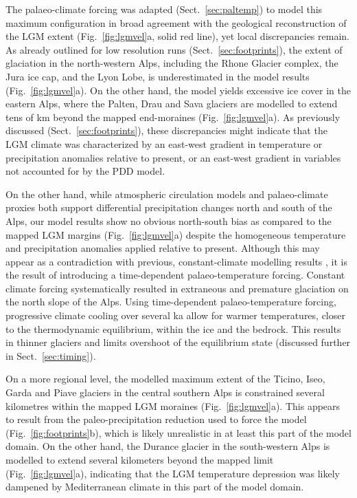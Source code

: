 \documentclass[tc, manuscript]{copernicus}
\begin{document}
    The palaeo-climate forcing was adapted (Sect.~\ref{sec:paltemp})
    to model this maximum configuration in broad agreement with the geological
    reconstruction of the LGM extent (Fig.~\ref{fig:lgmvel}a, solid red line),
    yet local discrepancies remain. As already outlined for low resolution
    runs (Sect.~\ref{sec:footprints}), the extent of glaciation in the
    north-western Alps, including the Rhone Glacier complex, the Jura ice cap,
    and the Lyon Lobe, is underestimated in the model results
    (Fig.~\ref{fig:lgmvel}a). On the other hand, the model yields excessive ice
    cover in the eastern Alps, where the Palten, Drau and Sava glaciers are
    modelled to extend tens of km beyond the mapped end-moraines
    (Fig.~\ref{fig:lgmvel}a). As previously discussed
    (Sect.~\ref{sec:footprints}), these discrepancies might indicate that the
    LGM climate was characterized by an east-west gradient in temperature
    \citep[cf.][]{Heyman.etal.2013} or precipitation
    \citep[cf.][]{Wu.etal.2007} anomalies relative to present, or an east-west
    gradient in variables not accounted for by the PDD model.

    On the other hand, while atmospheric circulation models
    \citep{Strandberg.etal.2011, Ludwig.etal.2016} and palaeo-climate proxies
    \citep{Luetscher.etal.2015} both support differential precipitation changes
    north and south of the Alps, our model results show no obvious north-south
    bias as compared to the mapped LGM margins (Fig.~\ref{fig:lgmvel}a) despite
    the homogeneous temperature and precipitation anomalies applied relative to
    present. Although this may appear as a contradiction with previous,
    constant-climate modelling results \citep{Becker.etal.2016}, it is the
    result of introducing a time-dependent palaeo-temperature forcing. Constant
    climate forcing systematically resulted in extraneous
    \citep[Fig.~3]{Becker.etal.2016} and premature
    \citep[Fig.~4]{Becker.etal.2016} glaciation on the north slope of the Alps.
    Using time-dependent palaeo-temperature forcing, progressive climate
    cooling over several ka allow for warmer temperatures, closer to
    the thermodynamic equilibrium, within the ice and the bedrock. This results
    in thinner glaciers and limits overshoot of the equilibrium state
    (discussed further in Sect.~\ref{sec:timing}).

    On a more regional level, the modelled maximum extent of the Ticino, Iseo,
    Garda and Piave glaciers in the central southern Alps is constrained
    several kilometres within the mapped LGM moraines (Fig.~\ref{fig:lgmvel}a).
    This appears to result
    from the paleo-precipitation reduction used to force the model
    (Fig.~\ref{fig:footprints}b), which is likely unrealistic in at least this
    part of the model domain. On the other hand, the Durance glacier in the
    south-western Alps is modelled to extend several kilometers beyond the
    mapped limit (Fig.~\ref{fig:lgmvel}a), indicating that the LGM temperature
    depression was likely
    dampened by Mediterranean climate in this part of the model domain.
\end{document}
